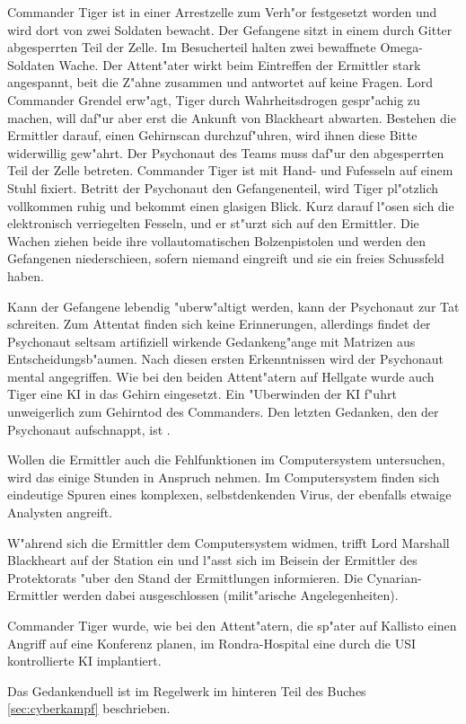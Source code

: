 Commander Tiger ist in einer Arrestzelle zum Verh"or festgesetzt worden und wird dort von zwei Soldaten bewacht. Der Gefangene sitzt in einem durch Gitter abgesperrten Teil der Zelle. Im Besucherteil halten zwei bewaffnete Omega-Soldaten Wache. Der Attent"ater wirkt beim Eintreffen der Ermittler stark angespannt, bei\3t die Z"ahne zusammen und antwortet auf keine Fragen. Lord Commander Grendel erw"agt, Tiger durch Wahrheitsdrogen gespr"achig zu machen, will daf"ur aber erst die Ankunft von Blackheart abwarten. Bestehen die Ermittler darauf, einen Gehirnscan durchzuf"uhren, wird ihnen diese Bitte widerwillig gew"ahrt. Der Psychonaut des Teams muss daf"ur den abgesperrten Teil der Zelle betreten. Commander Tiger ist mit Hand- und Fu\3fesseln auf einem Stuhl fixiert. Betritt der Psychonaut den Gefangenenteil, wird Tiger pl"otzlich vollkommen ruhig und bekommt einen glasigen Blick. Kurz darauf l"osen sich die elektronisch verriegelten Fesseln, und er st"urzt sich auf den Ermittler. Die Wachen ziehen beide ihre vollautomatischen Bolzenpistolen und werden den Gefangenen niederschie\3en, sofern niemand eingreift und sie ein freies Schussfeld haben.

Kann der Gefangene lebendig "uberw"altigt werden, kann der Psychonaut zur Tat schreiten. Zum Attentat finden sich keine Erinnerungen, allerdings findet der Psychonaut seltsam artifiziell wirkende Gedankeng"ange mit Matrizen aus Entscheidungsb"aumen. Nach diesen ersten Erkenntnissen wird der Psychonaut mental angegriffen. Wie bei den beiden Attent"atern auf Hellgate wurde auch Tiger eine KI in das Gehirn eingesetzt. Ein "Uberwinden der KI f"uhrt unweigerlich zum Gehirntod des Commanders. Den letzten Gedanken, den der Psychonaut aufschnappt, ist .

Wollen die Ermittler auch die Fehlfunktionen im Computersystem untersuchen, wird das einige Stunden in Anspruch nehmen. Im Computersystem finden sich eindeutige Spuren eines komplexen, selbstdenkenden Virus, der ebenfalls etwaige Analysten angreift.

W"ahrend sich die Ermittler dem Computersystem widmen, trifft Lord Marshall Blackheart auf der Station ein und l"asst sich im Beisein der Ermittler des Protektorats "uber den Stand der Ermittlungen informieren. Die Cynarian-Ermittler werden dabei ausgeschlossen (milit"arische Angelegenheiten).

\begin{remarks}
	Commander Tiger wurde, wie bei den Attent"atern, die sp"ater auf Kallisto einen Angriff auf eine Konferenz planen, im Rondra-Hospital eine durch die USI kontrollierte KI implantiert.

	Das Gedankenduell ist im Regelwerk im hinteren Teil des Buches \cref{sec:cyberkampf} beschrieben.
\end{remarks}
